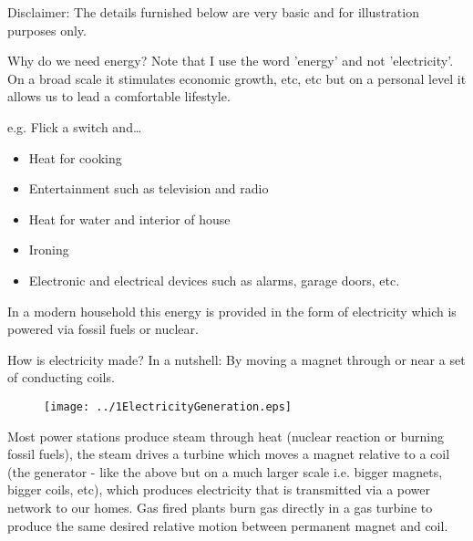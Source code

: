 
Disclaimer: The details furnished below are very basic and for
illustration purposes only.

Why do we need energy? Note that I use the word 'energy' and not
'electricity'. On a broad scale it stimulates economic growth, etc,
etc but on a personal level it allows us to lead a comfortable
lifestyle.

e.g. Flick a switch and… 
\begin{itemize}
\item Heat for cooking 
\item Entertainment such as television and radio 
\item Heat for water and interior of house 
\item Ironing
\item Electronic and electrical devices such as alarms, garage doors, etc.
\end{itemize}

In a modern household this energy is provided in the form of electricity which is powered via fossil fuels or nuclear.

How is electricity made? In a nutshell: By moving a magnet through or near a set of conducting coils.

\begin{figure}[H]
\centering
\texttt{[image: ../1ElectricityGeneration.eps]}
\end{figure}

Most power stations produce steam through heat (nuclear reaction or burning fossil fuels), the steam drives a turbine which moves a magnet relative to a coil (the generator - like the above but on a much larger scale i.e. bigger magnets, bigger coils, etc), which produces electricity that is transmitted via a power network to our homes. Gas fired plants burn gas directly in a gas turbine to produce the same desired relative motion between permanent magnet and coil.

